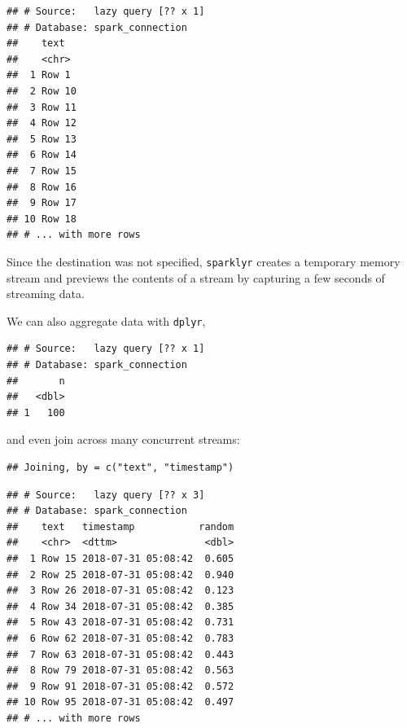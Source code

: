 \documentclass[]{book}
\newenvironment{Shaded}{\begin{snugshade}}{\end{snugshade}}
\newcommand{\DataTypeTok}[1]{\textcolor[rgb]{0.13,0.29,0.53}{#1}}
\newcommand{\KeywordTok}[1]{\textcolor[rgb]{0.13,0.29,0.53}{\textbf{#1}}}
\newcommand{\NormalTok}[1]{#1}
\newcommand{\OperatorTok}[1]{\textcolor[rgb]{0.81,0.36,0.00}{\textbf{#1}}}
\newcommand{\StringTok}[1]{\textcolor[rgb]{0.31,0.60,0.02}{#1}}
\theoremstyle{definition}
\theoremstyle{definition}
\theoremstyle{definition}
\theoremstyle{remark}
\begin{document}
\begin{verbatim}
## # Source:   lazy query [?? x 1]
## # Database: spark_connection
##    text  
##    <chr> 
##  1 Row 1 
##  2 Row 10
##  3 Row 11
##  4 Row 12
##  5 Row 13
##  6 Row 14
##  7 Row 15
##  8 Row 16
##  9 Row 17
## 10 Row 18
## # ... with more rows
\end{verbatim}

Since the destination was not specified, \texttt{sparklyr} creates a
temporary memory stream and previews the contents of a stream by
capturing a few seconds of streaming data.

We can also aggregate data with \texttt{dplyr},

\begin{Shaded}
\end{Shaded}

\begin{verbatim}
## # Source:   lazy query [?? x 1]
## # Database: spark_connection
##       n
##   <dbl>
## 1   100
\end{verbatim}

and even join across many concurrent streams:

\begin{Shaded}
\end{Shaded}

\begin{verbatim}
## Joining, by = c("text", "timestamp")
\end{verbatim}

\begin{verbatim}
## # Source:   lazy query [?? x 3]
## # Database: spark_connection
##    text   timestamp           random
##    <chr>  <dttm>               <dbl>
##  1 Row 15 2018-07-31 05:08:42  0.605
##  2 Row 25 2018-07-31 05:08:42  0.940
##  3 Row 26 2018-07-31 05:08:42  0.123
##  4 Row 34 2018-07-31 05:08:42  0.385
##  5 Row 43 2018-07-31 05:08:42  0.731
##  6 Row 62 2018-07-31 05:08:42  0.783
##  7 Row 63 2018-07-31 05:08:42  0.443
##  8 Row 79 2018-07-31 05:08:42  0.563
##  9 Row 91 2018-07-31 05:08:42  0.572
## 10 Row 95 2018-07-31 05:08:42  0.497
## # ... with more rows
\end{verbatim}
\end{document}
